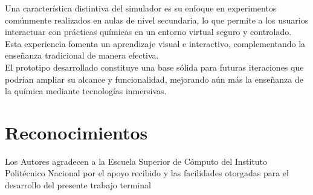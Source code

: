 \documentclass[conference]{IEEEtran}
\begin{document}
Una característica distintiva del simulador es su enfoque en experimentos comúnmente realizados en aulas de nivel secundaria, lo que permite a los usuarios interactuar con prácticas químicas en un entorno virtual seguro y controlado. Esta experiencia fomenta un aprendizaje visual e interactivo, complementando la enseñanza tradicional de manera efectiva.\\

El prototipo desarrollado constituye una base sólida para futuras iteraciones que podrían ampliar su alcance y funcionalidad, mejorando aún más la enseñanza de la química mediante tecnologías inmersivas.

\section{Reconocimientos}
Los Autores agradecen a la Escuela Superior de Cómputo del Instituto Politécnico Nacional por el apoyo recibido y las facilidades otorgadas para el desarrollo del presente trabajo terminal
\end{document}
